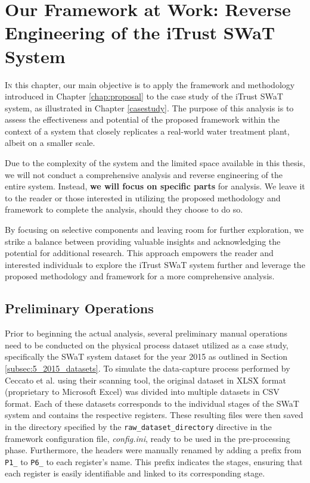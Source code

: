 \chapter[Our Framework at Work on the iTrust SWaT System]{Our Framework at Work: Reverse Engineering of the iTrust SWaT System}
\label{application}

\lettrine{I}{n} this chapter, our main objective is to apply the framework and methodology introduced in Chapter \ref{chap:proposal} to the case study of the iTrust SWaT system, as illustrated in Chapter \ref{casestudy}. The purpose of this analysis is to assess the effectiveness and potential of the proposed framework within the context of a system that closely replicates a real-world water treatment plant, albeit on a smaller scale.

\bigskip
Due to the complexity of the system and the limited space available in this thesis, we will not conduct a comprehensive analysis and reverse engineering of the entire system. Instead, \textbf{we will focus on specific parts} for analysis. We leave it to the reader or those interested in utilizing the proposed methodology and framework to complete the analysis, should they choose to do so.

By focusing on selective components and leaving room for further exploration, we strike a balance between providing valuable insights and acknowledging the potential for additional research. This approach empowers the reader and interested individuals to explore the iTrust SWaT system further and leverage the proposed methodology and framework for a more comprehensive analysis.
\vfill

\section{Preliminary Operations}
\label{sec:6_preliminar_operations}
Prior to beginning the actual analysis, several preliminary manual operations need to be conducted on the physical process dataset utilized as a case study, specifically the SWaT system dataset for the year 2015 as outlined in Section \ref{subsec:5_2015_datasets}. To simulate the data-capture process performed by Ceccato et al. using their scanning tool, the original dataset in XLSX format (proprietary to Microsoft Excel) was divided into multiple datasets in CSV format. Each of these datasets corresponds to the individual stages of the SWaT system and contains the respective registers. These resulting files were then saved in the directory specified by the \texttt{raw\_dataset\_directory} directive in the framework configuration file, \textit{config.ini}, ready to be used in the pre-processing phase.
Furthermore, the headers were manually renamed by adding a prefix from \texttt{P1\_} to \texttt{P6\_} to each register's name. This prefix indicates the stages, ensuring that each register is easily identifiable and linked to its corresponding stage.

